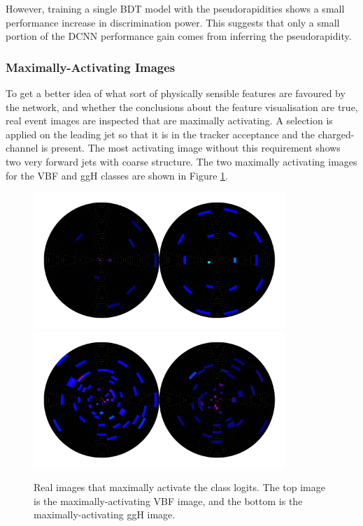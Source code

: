 However, training a single BDT model with the pseudorapidities shows a small performance increase in discrimination power. This suggests that only a small portion of the DCNN performance gain comes from inferring the pseudorapidity. 


\subsubsection{Maximally-Activating Images}
To get a better idea of what sort of physically sensible features are favoured by the network, and whether the conclusions about the feature visualisation are true, real event images are inspected that are maximally activating. 
A selection is applied on the leading jet so that it is in the tracker acceptance and the charged-\pt  channel is present. The most activating image without this requirement shows two very forward jets with coarse structure.  The two maximally activating images for the VBF and ggH classes are shown in Figure \ref{fig:event_categorisation:maxact_vis_vbf_ggh}.
\begin{figure}[h!]
    \centering
    \includegraphics[width=0.85\textwidth]{figures/event_selection/max_img_vbf_tkr_cut_logits_normtype1.pdf}
    \includegraphics[width=0.85\textwidth]{figures/event_selection/max_img_ggh_tkr_cut_logits_normtype1.pdf}
    \caption{Real images that maximally activate the class logits. 
             The top image is the maximally-activating VBF image, and the bottom is the maximally-activating ggH image. }
    \label{fig:event_categorisation:maxact_vis_vbf_ggh}
\end{figure}

